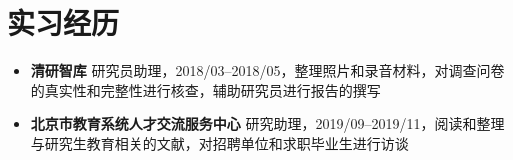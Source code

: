 \section{实习经历}

\begin{itemize}
    \item \textbf{清研智库} 研究员助理，2018/03--2018/05，整理照片和录音材料，对调查问卷的真实性和完整性进行核查，辅助研究员进行报告的撰写
    \item \textbf{北京市教育系统人才交流服务中心} 研究助理，2019/09--2019/11，阅读和整理与研究生教育相关的文献，对招聘单位和求职毕业生进行访谈
\end{itemize}
